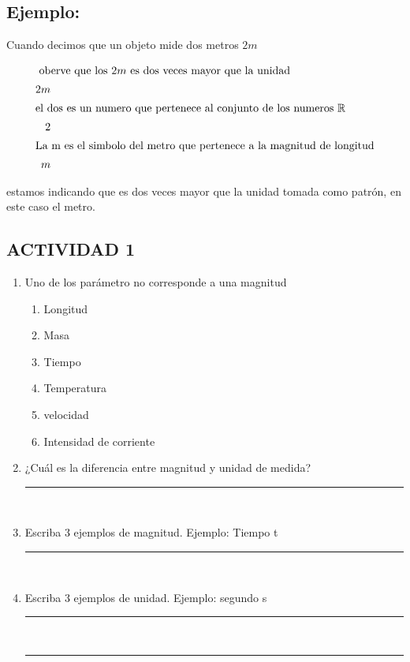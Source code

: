 \documentclass[12pt]{article}
\begin{document}
 \begin{tcolorbox}[colback=red!15!]
 
 
 \subsection*{Ejemplo: } 
 Cuando decimos que un objeto mide dos metros $2m$
 
\begin{align*}
\intertext{ oberve que los $2m$ es dos veces mayor que la unidad}
2m\\ \intertext{el dos es un numero que pertenece al conjunto de los numeros $\mathbb{R}$}
2\\
\intertext{La m es el simbolo del metro que pertenece a la magnitud de longitud}
m 
\end{align*}
 
 




  
 estamos indicando que es dos veces mayor que la unidad tomada como patrón, en este caso el metro.
 \end{tcolorbox}
 
 
 \begin{tcolorbox}[colback=red!15!white]
 \centering
  \subsection*{ACTIVIDAD 1}
 \end{tcolorbox}


 \begin{enumerate}
\item Uno de los parámetro no corresponde a una magnitud
\begin{multicols}{2}
\begin{enumerate}
\item Longitud
\item Masa 
\item Tiempo
\item Temperatura
\item velocidad
\item Intensidad de corriente

\end{enumerate}
\end{multicols}
\item ¿Cuál es la diferencia entre magnitud y unidad de medida?\\
\rule{110mm}{0.1mm}\\



\item Escriba 3 ejemplos de magnitud. 
Ejemplo: Tiempo t\\
\rule{110mm}{0.1mm}\\



\item Escriba 3 ejemplos de unidad.
Ejemplo: segundo  s\\
\rule{110mm}{0.1mm}\\
\rule{110mm}{0.1mm}\\

\end{enumerate}
\end{document}
